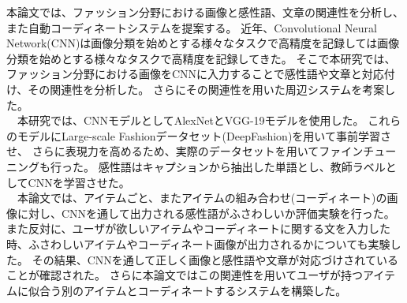 \abstract

本論文では、ファッション分野における画像と感性語、文章の関連性を分析し、また自動コーディネートシステムを提案する。
近年、Convolutional Neural Network(CNN)は画像分類を始めとする様々なタスクで高精度を記録しては画像分類を始めとする様々なタスクで高精度を記録してきた。
そこで本研究では、ファッション分野における画像をCNNに入力することで感性語や文章と対応付け、その関連性を分析した。
さらにその関連性を用いた周辺システムを考案した。
\\
　本研究では、CNNモデルとしてAlexNetとVGG-19モデルを使用した。
これらのモデルにLarge-scale Fashionデータセット(DeepFashion)を用いて事前学習させ、
さらに表現力を高めるため、実際のデータセットを用いてファインチューニングも行った。
感性語はキャプションから抽出した単語とし、教師ラベルとしてCNNを学習させた。
\\
　本論文では、アイテムごと、またアイテムの組み合わせ(コーディネート)の画像に対し、CNNを通して出力される感性語がふさわしいか評価実験を行った。
また反対に、ユーザが欲しいアイテムやコーディネートに関する文を入力した時、ふさわしいアイテムやコーディネート画像が出力されるかについても実験した。
その結果、CNNを通して正しく画像と感性語や文章が対応づけされていることが確認された。
さらに本論文ではこの関連性を用いてユーザが持つアイテムに似合う別のアイテムとコーディネートするシステムを構築した。

